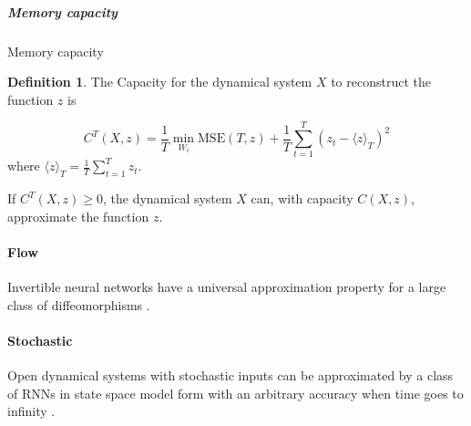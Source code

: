 \documentclass{article}
\theoremstyle{definition}
\newtheorem{definition}{Definition}
\theoremstyle{remark}
\begin{document}
\subparagraph{Memory capacity}
Memory capacity \citep{dambre2012}
\begin{definition}
The Capacity for the dynamical system \( X \) to reconstruct the function \( z \) is

\[
C^T(X, z) = \frac{1}{T} \min_{W_i} \text{MSE}(T, z) + \frac{1}{T} \sum_{t=1}^{T} \left( z_t - \langle z \rangle_T \right)^2
\tag{5}
\]
where \( \langle z \rangle_T = \frac{1}{T} \sum_{t=1}^{T} z_t \).

If \( C^T(X, z) \geq 0 \), the dynamical system \( X \) can, with capacity \( C(X, z) \), approximate the function \( z \).
\end{definition}




\paragraph{Flow}
Invertible neural networks have a universal approximation property for a  large class of diffeomorphisms   \citep{ishikawa2023universal}.


\paragraph{Stochastic}

\citep{hart2021echo}

\citep{gonon2019reservoir}

Open dynamical systems with stochastic inputs can be approximated by a class of RNNs in state space model form with an arbitrary accuracy when time goes to infinity \citep{chen2022universal}.
\end{document}

